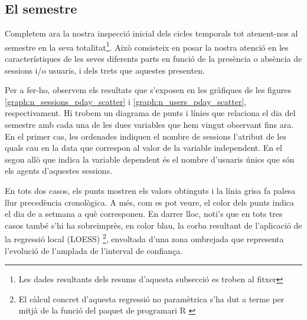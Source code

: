 \documentclass[
	a4paper,
	twoside,
	justified
]{tufte-book}
\begin{document}
\subsection{El semestre}

Completem ara la nostra inspecció inicial dels cicles temporals tot atenent-nos al semestre en la seva totalitat\footnote{Les dades resultants dels resums d'aquesta subsecció es troben al fitxer }. Això consisteix en posar la nostra atenció en les característiques de les seves diferents parts en funció de la presència o absència de sessions i/o usuaris, i dels trets que aquestes presenten. 

Per a fer-ho, observem els resultats que s'exposen en les gràfiques de les figures \ref{graph:n_sessions_pday_scatter} i \ref{graph:n_users_pday_scatter}, respectivament. Hi trobem un diagrama de punts i línies que relaciona el dia del semestre amb cada una de les dues variables que hem vingut observant fins ara. En el primer cas, les ordenades indiquen el nombre de sessions l'atribut  de les quals cau en la data que correspon al valor de la variable independent. En el segon allò que indica la variable dependent és el nombre d'usuaris únics que són els agents d'aquestes sessions.

En tots dos casos, els punts mostren els valors obtinguts i la línia grisa fa palesa llur precedència cronològica. A més, com es pot veure, el color dels punts indica el dia de a setmana a què corresponen. En darrer lloc, noti's que en tots tres casos també s'hi ha sobreimprès, en color blau, la corba resultant de l'aplicació de la regressió local (LOESS) \citep{cleveland79}\footnote{El càlcul concret d'aquesta regressió no paramètrica s'ha dut a terme per mitjà de la funció  del paquet  de programari R \citep{rteam14}}, envoltada d'una zona ombrejada que representa l'evolució de l'amplada de l'interval de confiança.     
\end{document}

